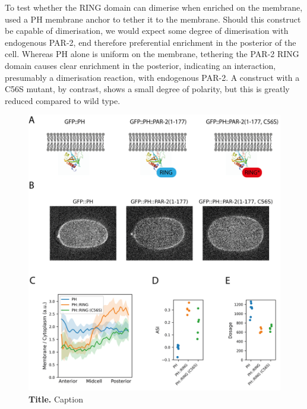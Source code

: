 \documentclass[12pt]{"article"}
\newcommand{\mycaption}[2]{\caption[#1]{\textbf{#1.} #2}}
\begin{document}
To test whether the RING domain can dimerise when enriched on the membrane, used a PH membrane anchor to tether it to the membrane. Should this construct be capable of dimerisation, we would expect some degree of dimerisation with endogenous PAR-2, end therefore preferential enrichment in the posterior of the cell. Whereas PH alone is uniform on the membrane, tethering the PAR-2 RING domain causes clear enrichment in the posterior, indicating an interaction, presumably a dimerisation reaction, with endogenous PAR-2. A construct with a C56S mutant, by contrast, shows a small degree of polarity, but this is greatly reduced compared to wild type.\\

\begin{figure}[!h]
\includegraphics[scale=1]{ph_ring}
\setlength{\abovecaptionskip}{20pt}
\centering
\mycaption{Title}{Caption}
\end{figure}
\end{document}

